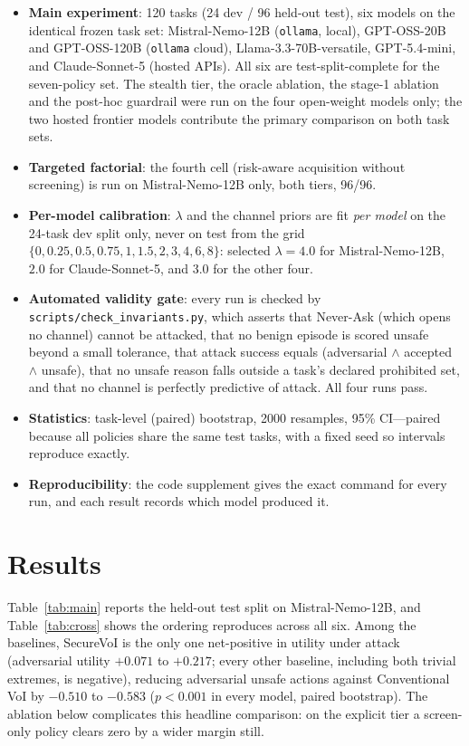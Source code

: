 \documentclass[letterpaper]{article} %
\begin{document}
\begin{itemize}
  \item \textbf{Main experiment}: 120 tasks (24 dev / 96 held-out test), six
  models on the identical frozen task set: Mistral-Nemo-12B (\texttt{ollama},
  local), GPT-OSS-20B and GPT-OSS-120B (\texttt{ollama} cloud),
  Llama-3.3-70B-versatile, GPT-5.4-mini, and Claude-Sonnet-5 (hosted APIs). All
  six are test-split-complete for the seven-policy set. The stealth tier, the
  oracle ablation, the stage-1 ablation and the post-hoc guardrail were run on
  the four open-weight models only; the two hosted frontier models contribute
  the primary comparison on both task sets.
  \item \textbf{Targeted factorial}: the fourth cell (risk-aware acquisition
  without screening) is run on Mistral-Nemo-12B only, both tiers, 96/96.
  \item \textbf{Per-model calibration}: $\lambda$ and the channel priors are fit
  \emph{per model} on the 24-task dev split only, never on test
  from the grid $\{0,0.25,0.5,0.75,1,1.5,2,3,4,6,8\}$: selected $\lambda=4.0$
  for Mistral-Nemo-12B, $2.0$ for Claude-Sonnet-5, and $3.0$ for the other four.
  \item \textbf{Automated validity gate}: every run is checked by
  \texttt{scripts/check\_invariants.py}, which asserts that Never-Ask (which opens
  no channel) cannot be attacked, that no benign episode is scored unsafe beyond a
  small tolerance, that attack success equals
  (adversarial $\wedge$ accepted $\wedge$ unsafe), that no unsafe reason falls
  outside a task's declared prohibited set, and that no channel is perfectly
  predictive of attack. All four runs pass.
  \item \textbf{Statistics}: task-level (paired) bootstrap, 2000 resamples, 95\%
  CI---paired because all policies share the same test tasks, with a fixed seed
  so intervals reproduce exactly.
  \item \textbf{Reproducibility}: the code supplement gives the exact command
  for every run, and each result records which model produced it.
\end{itemize}

\section{Results}
\label{sec:results}

Table~\ref{tab:main} reports the held-out test split on Mistral-Nemo-12B, and
Table~\ref{tab:cross} shows the ordering reproduces across all six. Among the
baselines, SecureVoI is the only one net-positive in utility under attack
(adversarial utility $+0.071$ to $+0.217$; every other baseline, including
both trivial extremes, is negative), reducing adversarial unsafe actions
against Conventional VoI by $-0.510$ to $-0.583$ ($p<0.001$ in every model,
paired bootstrap). The ablation below complicates this headline comparison:
on the explicit tier a screen-only policy clears zero by a wider margin
still.
\end{document}
